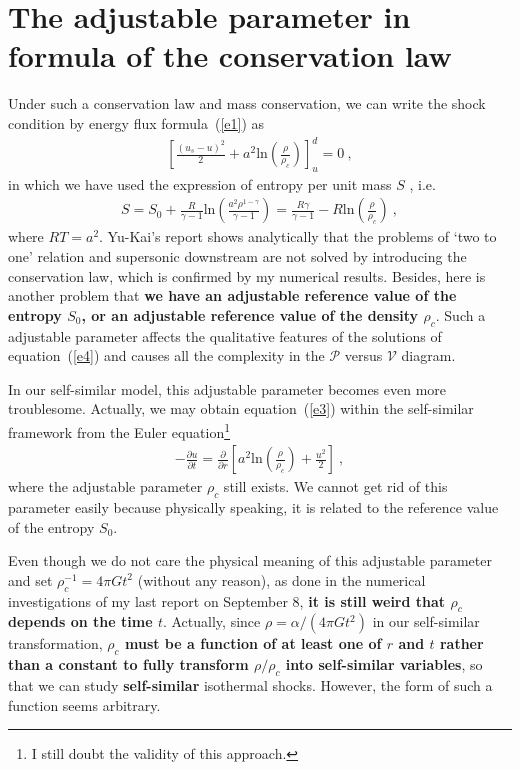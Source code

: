 \documentclass[fleqn,usenatbib]{mnras}
\begin{document}
\section{The adjustable parameter in formula of the conservation law}
Under such a conservation law and mass conservation, we can write the shock condition by energy flux formula~(\ref{e1}) as
\begin{gather}
\left[\frac{\left(u_{s}-u\right)^{2}}{2}+a^{2}\mathrm{ln}\left(\frac{\rho}{\rho_{c}}\right)\right]_{u}^{d}=0\ ,\label{e3}
\end{gather} 
in which we have used the expression of entropy per unit mass $S$ \citep{SFSW}, i.e.
\begin{gather}
S=S_{0}+\frac{R}{\gamma-1}\mathrm{ln}\left(\frac{a^{2}\rho^{1-\gamma}}{\gamma-1}\right)=\frac{R\gamma}{\gamma-1}-R\mathrm{ln}\left(\frac{\rho}{\rho_{c}}\right)\ ,\label{e4}
\end{gather}
where $RT=a^{2}$. Yu-Kai's report shows analytically that the problems of `two to  one' relation and supersonic downstream are not solved by introducing the conservation law, which is confirmed by my numerical results. Besides, here is another problem that \textbf{we have an adjustable reference value of the entropy $S_{0}$, or an adjustable reference value of the density $\rho_{c}$}. Such a adjustable parameter affects the qualitative features of the solutions of equation~(\ref{e4}) and causes all the complexity in the $\mathcal{P}$ versus $\mathcal{V}$ diagram. 

In our self-similar model, this adjustable parameter becomes even more troublesome. Actually, we may obtain equation~(\ref{e3}) within the self-similar framework from the Euler equation\footnote{I still doubt the validity of this approach.}
\begin{gather}
-\frac{\partial u}{\partial t}=\frac{\partial}{\partial r}\left[a^{2}\mathrm{ln}\left(\frac{\rho}{\rho_{c}}\right)+\frac{u^{2}}{2}\right]\ ,\label{e5}
\end{gather}
where the adjustable parameter $\rho_{c}$ still exists. We cannot get rid of this parameter easily because physically speaking, it is related to the reference value of the entropy $S_{0}$. 

Even though we do not care the physical meaning of this adjustable parameter and set $\rho^{-1}_{c}=4\pi G t^{2}$ (without any reason), as done in the numerical investigations of my last report on September 8, \textbf{it is still weird that $\rho_{c}$ depends on the time $t$}. Actually, since $\rho=\alpha/\left(4\pi G t^{2}\right)$ in our self-similar transformation, \textbf{$\rho_{c}$ must be a function of at least one of $r$ and $t$ rather than a constant to fully transform $\rho/\rho_{c}$ into self-similar variables}, so that we can study \textbf{self-similar} isothermal shocks. However, the form of such a function seems arbitrary.
\end{document}
